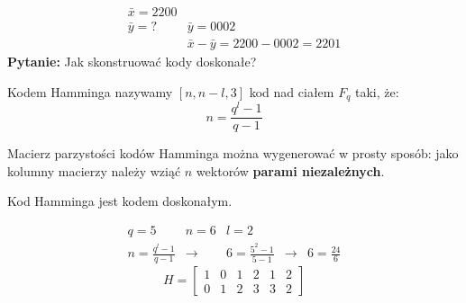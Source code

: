 \begin{align*}
\bar{x}=2200\\
\bar{y}=? &\bar{y}=0002\\
&\bar{x}-\bar{y}=2200-0002=2201
\end{align*}
\textbf{Pytanie:} Jak skonstruować kody doskonałe?
\begin{definition}
Kodem Hamminga nazywamy $[n, n-l, 3]$ kod nad ciałem $F_q$ taki, że: $$n=\frac{q^l-1}{q-1}$$

Macierz parzystości kodów Hamminga można wygenerować w prosty sposób: jako kolumny macierzy należy wziąć $n$ wektorów \textbf{parami niezależnych}.
\end{definition}
\begin{fact}
Kod Hamminga jest kodem doskonałym.
\end{fact}
\begin{example*}
\begin{align*}
q=5 & n=6 &l=2 \\
n=\frac{q^l-1}{q-1} & \rightarrow & 6=\frac{5^2-1}{5-1} &\rightarrow &6=\frac{24}{6}
\end{align*}
$$H=\begin{bmatrix}
1&0&1&2&1&2\\0&1&2&3&3&2
\end{bmatrix}$$

\end{example*}
 

